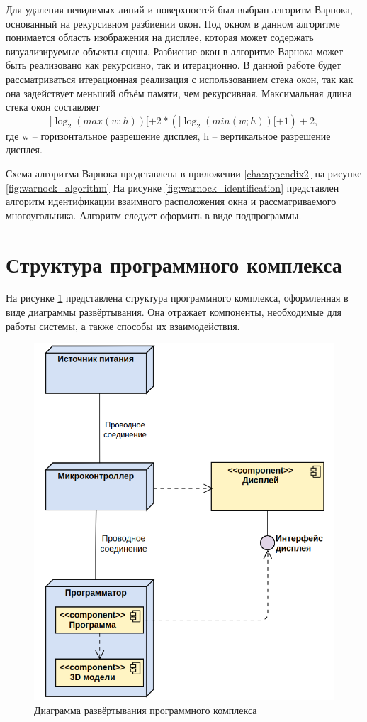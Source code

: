 Для удаления невидимых линий и поверхностей был выбран алгоритм Варнока, основанный на рекурсивном разбиении окон. Под окном в данном 
алгоритме понимается область изображения на дисплее, которая может содержать визуализируемые объекты сцены. Разбиение окон в алгоритме 
Варнока может быть реализовано как рекурсивно, так и итерационно. В данной работе будет рассматриваться итерационная реализация с 
использованием стека окон, так как она задействует меньший объём памяти, чем рекурсивная. Максимальная длина стека окон составляет
\begin{equation}
]\log_{2} (max(w; h))[ + 2 * (]\log_{2} (min(w; h))[ + 1) + 2,
\label{F:F1}
\end{equation}
где w – горизонтальное разрешение дисплея, h – вертикальное разрешение дисплея.

Схема алгоритма Варнока представлена в приложении \ref{cha:appendix2} на рисунке \ref{fig:warnock_algorithm} На рисунке 
\ref{fig:warnock_identification} представлен алгоритм идентификации взаимного расположения окна и рассматриваемого многоугольника. Алгоритм 
следует оформить в виде подпрограммы.

\section{Структура программного комплекса}
На рисунке \ref{fig:deploy_diagram} представлена структура программного комплекса, оформленная в виде диаграммы развёртывания. Она отражает компоненты, необходимые для работы системы, а также способы их взаимодействия.

\begin{figure}[h]
	\centering
	\includegraphics[scale=0.777 ]{img/deploy_diagram/dd1.png}
	\caption{Диаграмма развёртывания программного комплекса}
	\label{fig:deploy_diagram}
\end{figure} 

